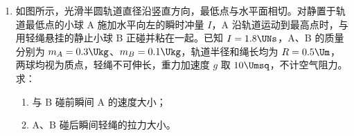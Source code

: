 \documentclass[\gkver]{gaokaozhenti}
\begin{document}
\begin{enumerate}
{（3）根据牛顿第二定律，对砝码 $mg - T = ma$

对小车 $T = Ma$

可得 $T = \frac{Mmg}{M + m} = \frac{1}{1 + \frac{m}{M}}mg$

则当 $m$ 较小时传感器的示数越接近砝码的重力 $mg$；$m$ 越大，则传感器的示数与砝码重力的差异越大，即这两种方式得到的合力差异最大时，槽码质量为 $40 \Ug$。
}

\item
如图所示，光滑半圆轨道直径沿竖直方向，最低点与水平面相切。对静置于轨道最低点的小球 A 施加水平向左的瞬时冲量 $I$，A 沿轨道运动到最高点时，与用轻绳悬挂的静止小球 B 正碰并粘在一起。已知 $I = 1.8 \UNs$，A、B 的质量分别为 $m_{A} = 0.3 \Ukg$、$m_{B} = 0.1 \Ukg$，轨道半径和绳长均为 $R = 0.5 \Um$，两球均视为质点，轻绳不可伸长，重力加速度 $g$ 取 $10 \Umsq$，不计空气阻力。求：
\begin{enumerate}
	\item
	与 B 碰前瞬间 A 的速度大小；
	\item
	A、B 碰后瞬间轻绳的拉力大小。
\end{enumerate}
\jdanswer{
\begin{enumerate}
	\item
	$4 \Ums$

	\item
	$11.2 \UN$

\end{enumerate}
}


\end{enumerate}
\end{document}
